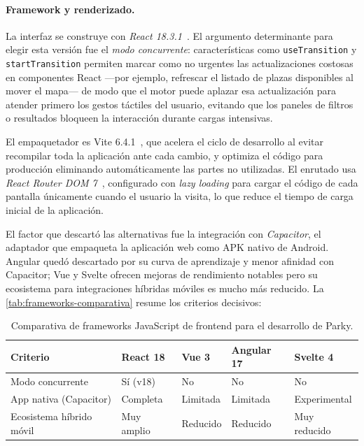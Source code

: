 \paragraph{Framework y renderizado.}
La interfaz se construye con \textit{React 18.3.1}~\cite{react2024}. El argumento determinante para elegir esta versión fue el \textit{modo concurrente}: características como \texttt{useTransition} y \texttt{startTransition} permiten marcar como no urgentes las actualizaciones costosas en componentes React —por ejemplo, refrescar el listado de plazas disponibles al mover el mapa— de modo que el motor puede aplazar esa actualización para atender primero los gestos táctiles del usuario, evitando que los paneles de filtros o resultados bloqueen la interacción durante cargas intensivas.

El empaquetador es Vite 6.4.1~\cite{vitejs2024}, que acelera el ciclo de desarrollo al evitar recompilar toda la aplicación ante cada cambio, y optimiza el código para  producción eliminando automáticamente las partes no utilizadas. El enrutado usa \textit{React Router DOM 7}~\cite{reactrouter2024}, configurado con \textit{lazy loading} para cargar el código de cada pantalla únicamente cuando el usuario la visita, lo que reduce el tiempo de carga inicial de la aplicación.

El factor que descartó las alternativas fue la integración con \textit{Capacitor}, el adaptador que empaqueta la aplicación web como APK nativo de Android. Angular quedó descartado por su curva de aprendizaje y menor afinidad con Capacitor; Vue y Svelte ofrecen mejoras de rendimiento notables pero su ecosistema para integraciones híbridas móviles es mucho más reducido. La \autoref{tab:frameworks-comparativa} resume los criterios decisivos:

\begin{table}[htbp]
  \centering
  \caption{Comparativa de frameworks JavaScript de frontend para el desarrollo de Parky.}
  \label{tab:frameworks-comparativa}
  \begin{tabularx}{\textwidth}{lXXXX}
    \toprule
    \textbf{Criterio}        & \textbf{React 18} & \textbf{Vue 3} & \textbf{Angular 17} & \textbf{Svelte 4} \\
    \midrule
    Modo concurrente         & Sí (v18)          & No             & No                  & No                \\
    App nativa (Capacitor)   & Completa          & Limitada       & Limitada            & Experimental      \\
    Ecosistema híbrido móvil & Muy amplio        & Reducido       & Reducido            & Muy reducido      \\
    \bottomrule
  \end{tabularx}
\end{table}

